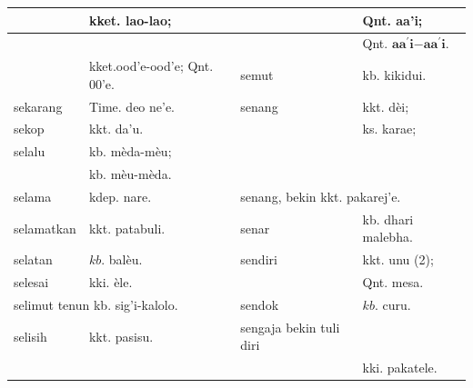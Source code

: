\documentclass[10pt]{article}
\begin{document}
\begin{center}
\begin{tabular}{|l|l|l|l|}
\hline
 & kket. lao-lao; &  & Qnt. aa'i; \\
\hline
 &  &  & Qnt. \(\boldsymbol{a} \boldsymbol{a}^{\mathbf{\prime}} \mathbf{i} \mathbf{-} \boldsymbol{a} \boldsymbol{a}^{\mathbf{\prime}} \mathbf{i}\). \\
\hline
 & kket.ood'e-ood'e; Qnt. 00'e. & semut & kb. kikidui. \\
\hline
sekarang & Time. deo ne'e. & senang & kkt. dèi; \\
\hline
sekop & kkt. da'u. &  & ks. karae; \\
\hline
selalu & kb. mèda-mèu; &  &  \\
\hline
 & kb. mèu-mèda. &  &  \\
\hline
selama & kdep. nare. & \multicolumn{2}{|l|}{senang, bekin kkt. pakarej'e.} \\
\hline
selamatkan & kkt. patabuli. & senar & kb. dhari malebha. \\
\hline
selatan & \(k b\). balèu. & sendiri & kkt. unu (2); \\
\hline
selesai & kki. èle. &  & Qnt. mesa. \\
\hline
\multicolumn{2}{|l|}{selimut tenun kb. sig'i-kalolo.} & sendok & \(k b\). curu. \\
\hline
selisih & kkt. pasisu. & sengaja bekin tuli diri &  \\
\hline
 &  &  & kki. pakatele. \\
\hline
\end{tabular}
\end{center}
\end{document}
